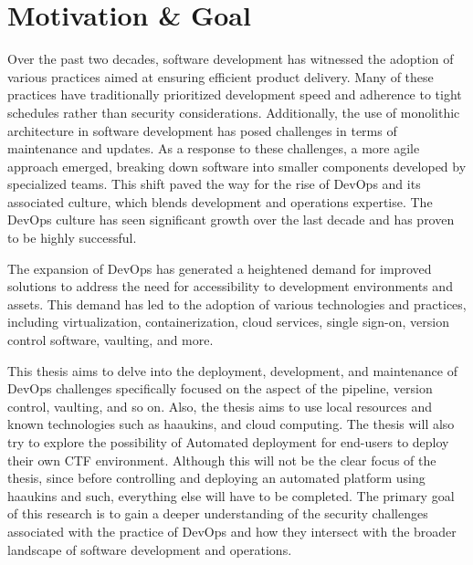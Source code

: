 \documentclass[a4, 12pt]{article}
\begin{document}
\newpage

\tableofcontents
\thispagestyle{empty}
\newpage

\section{Motivation \& Goal}
\setcounter{page}{1}
Over the past two decades, software development has 
witnessed the adoption of various practices aimed at 
ensuring efficient product delivery. Many of these practices 
have traditionally prioritized development speed and adherence 
to tight schedules rather than security considerations. 
Additionally, the use of monolithic architecture in software 
development has posed challenges in terms of maintenance and updates. 
As a response to these challenges, a more agile approach emerged, 
breaking down software into smaller components developed by specialized teams. 
This shift paved the way for the rise of DevOps and its associated culture, 
which blends development and operations expertise. The DevOps culture has seen 
significant growth over the last decade and has proven to be highly successful.

The expansion of DevOps has generated a heightened demand for 
improved solutions to address the need for accessibility to 
development environments and assets. This demand has led to 
the adoption of various technologies and practices, 
including virtualization, containerization, cloud services, single sign-on, version control software, vaulting, and more.

This thesis aims to delve into the deployment, development, and maintenance of DevOps
challenges specifically focused on the aspect of the pipeline, version control, vaulting, and so on. 
Also, the thesis aims to use local resources and known technologies such as haaukins, and cloud computing.
The thesis will also try to explore the possibility of Automated
deployment for end-users to deploy their own CTF environment. Although this will not be the clear focus of the thesis,
since before controlling and deploying an automated platform using haaukins and such, everything else will have to be completed.
The primary goal of this research is to gain a deeper understanding of the security challenges
associated with the practice of
DevOps and how they intersect with the broader landscape of software development and operations.
\end{document}
